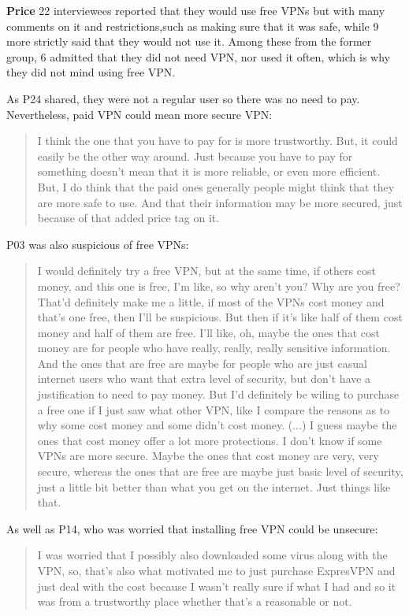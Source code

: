 \textbf{Price}
22 interviewees reported that they would use free VPNs but with many comments on it and restrictions,such as making sure that it was safe, while 9 more strictly said that they would not use it. Among these from the former group, 6 admitted that they did not need VPN, nor used it often, which is why they did not mind using free VPN. 

As P24 shared, they were not a regular user so there was no need to pay. Nevertheless, paid VPN could mean more secure VPN:
\begin{quote} I think the one that you have to pay for is more trustworthy. But, it could easily be the other way around. Just because you have to pay for something doesn't mean that it is more reliable, or even more efficient. But, I do think that the paid ones generally people might think that they are more safe to use. And that their information may be more secured, just because of that added price tag on it.\end{quote}

P03 was also suspicious of free VPNs:
\begin{quote}I would definitely try a free VPN, but at the same time, if others cost money, and this one is free, I'm like, so why aren't you? Why are you free? That'd definitely make me a little, if most of the VPNs cost money and that's one free, then I'll be suspicious. But then if it's like half of them cost money and half of them are free. I'll like, oh, maybe the ones that cost money are for people who have really, really, really sensitive information. And the ones that are free are maybe for people who are just casual internet users who want that extra level of security, but don't have a justification to need to pay money. But I'd definitely be wiling to purchase a free one if I just saw what other VPN, like I compare the reasons as to why some cost money and some didn't cost money. (...) I guess maybe the ones that cost money offer a lot more protections. I don't know if some VPNs are more secure. Maybe the ones that cost money are very, very secure, whereas the ones that are free are maybe just basic level of security, just a little bit better than what you get on the internet. Just things like that.\end{quote}

As well as P14, who was worried that installing free VPN could be unsecure:
\begin{quote}I was worried that I possibly also downloaded some virus along with the VPN, so, that's also what motivated me to just purchase ExpresVPN and just deal with the cost because I wasn't really sure if what I had and so it was from a trustworthy place whether that's a reasonable or not.\end{quote}

